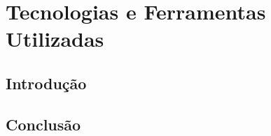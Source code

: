 \chapter{Tecnologias e Ferramentas Utilizadas}
\label{ch::tecno-ferr}

\section{Introdução}
\label{sec::tecno-ferr:intro}

\section{Conclusão}
\label{sec::tecno-ferr:conc}
